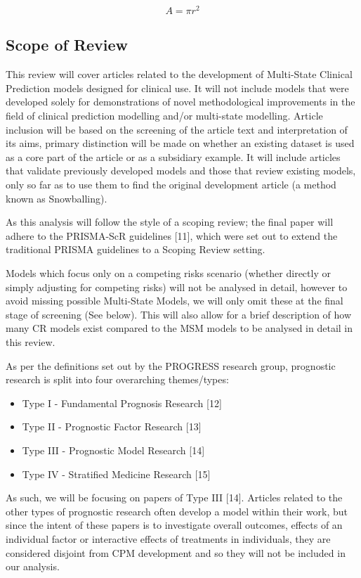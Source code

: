 \documentclass[12pt,PhD,twoside,openright]{muthesis}
\providecommand{\tightlist}{%
  \setlength{\itemsep}{0pt}\setlength{\parskip}{0pt}}
\begin{document}
\[ 
A= \pi r^2
\]

\hypertarget{scope-of-review}{%
\subsection{Scope of Review}\label{scope-of-review}}

This review will cover articles related to the development of Multi-State Clinical Prediction models designed for clinical use. It will not include models that were developed solely for demonstrations of novel methodological improvements in the field of clinical prediction modelling and/or multi-state modelling. Article inclusion will be based on the screening of the article text and interpretation of its aims, primary distinction will be made on whether an existing dataset is used as a core part of the article or as a subsidiary example. It will include articles that validate previously developed models and those that review existing models, only so far as to use them to find the original development article (a method known as Snowballing).

As this analysis will follow the style of a scoping review; the final paper will adhere to the PRISMA-ScR guidelines {[}11{]}, which were set out to extend the traditional PRISMA guidelines to a Scoping Review setting.

Models which focus only on a competing risks scenario (whether directly or simply adjusting for competing risks) will not be analysed in detail, however to avoid missing possible Multi-State Models, we will only omit these at the final stage of screening (See below). This will also allow for a brief description of how many CR models exist compared to the MSM models to be analysed in detail in this review.

As per the definitions set out by the PROGRESS research group, prognostic research is split into four overarching themes/types:
\begin{itemize}
\tightlist
\item
  Type I - Fundamental Prognosis Research {[}12{]}
\item
  Type II - Prognostic Factor Research {[}13{]}
\item
  Type III - Prognostic Model Research {[}14{]}
\item
  Type IV - Stratified Medicine Research {[}15{]}
\end{itemize}
As such, we will be focusing on papers of Type III {[}14{]}. Articles related to the other types of prognostic research often develop a model within their work, but since the intent of these papers is to investigate overall outcomes, effects of an individual factor or interactive effects of treatments in individuals, they are considered disjoint from CPM development and so they will not be included in our analysis.
\end{document}
